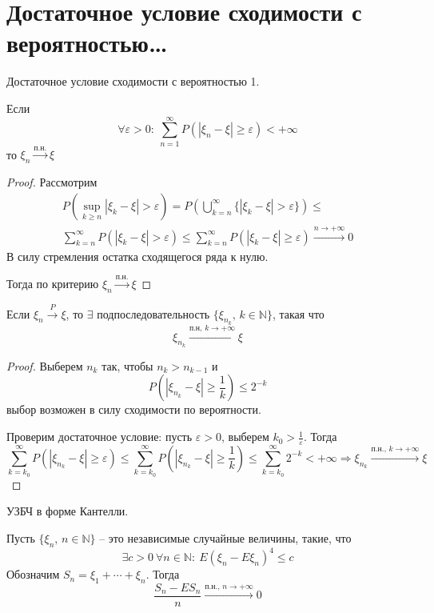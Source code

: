 \section{Достаточное условие сходимости с вероятностью\dots}
\begin{lemma}
	Достаточное условие сходимости с вероятностью 1.

	Если
	\[\forall \varepsilon > 0:\: \sum_{n = 1}^\infty P(|\xi_n - \xi| \geq \varepsilon) < +\infty\]
	то $\xi_n \stackrel{\text{п.н.}}{\to} \xi$
\end{lemma}

\begin{proof}
	Рассмотрим
	\begin{align*}
		P(\sup_{k \geq n}|\xi_k - \xi| > \varepsilon) = P\left(\bigcup_{k = n}^\infty \{|\xi_k - \xi| > \varepsilon\}\right) \leq \\
		\sum_{k = n}^\infty P(|\xi_k - \xi| > \varepsilon) \leq \sum_{k = n}^\infty P(|\xi_k - \xi| \geq \varepsilon) \stackrel{n \to +\infty}{\to} 0
	\end{align*}
	В силу стремления остатка сходящегося ряда к нулю.

	Тогда по критерию $\xi_n \stackrel{\text{п.н.}}{\to} \xi$
\end{proof}

\begin{corollary}
	Если $\xi_n \stackrel{P}{\to} \xi$, то $\exists$ подпоследовательность $\{\xi_{n_k},\, k \in \mathbb{N}\}$, такая что
	\[\xi_{n_k} \stackrel{\text{п.н},\, k \to +\infty}{\to} \xi\]
\end{corollary}

\begin{proof}
	Выберем $n_k$ так, чтобы $n_k > n_{k - 1}$ и
	\[P(|\xi_{n_k} - \xi| \geq \frac{1}{k}) \leq 2^{-k}\]
	выбор возможен в силу сходимости по вероятности.

	Проверим достаточное условие: пусть $\varepsilon > 0$, выберем $k_0 > \frac{1}{\varepsilon}$. Тогда
	\[
		\sum_{k = k_0}^\infty P(|\xi_{n_k} - \xi| \geq \varepsilon) \leq \sum_{k = k_0}^\infty P(|\xi_{n_k} - \xi| \geq \frac{1}{k}) \leq \sum_{k = k_0}^\infty 2^{-k} < +\infty \Rightarrow \xi_{n_k} \stackrel{\text{п.н.},\, k \to +\infty}{\to} \xi
	\]
\end{proof}

\begin{theorem}
	УЗБЧ в форме Кантелли.

	Пусть $\{\xi_n,\, n \in \mathbb{N}\}$ -- это независимые случайные величины, такие, что
	\[\exists c > 0 \: \forall n \in \mathbb{N}:\: E(\xi_n - E\xi_n)^4 \leq c\]
	Обозначим $S_n = \xi_1 + \cdots + \xi_n$. Тогда
	\[\frac{S_n - ES_n}{n} \stackrel{\text{п.н.},\, n \to +\infty}{\to} 0\]
\end{theorem}

